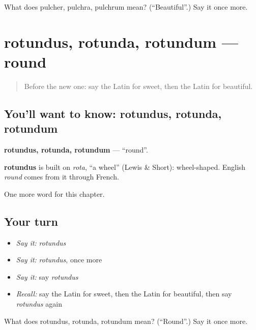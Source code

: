\begin{tcolorbox}[breakable,colback=teal!4,colframe=teal!35!black,title={Before you move on}]
What does pulcher, pulchra, pulchrum mean? (\textquotedblleft{}Beautiful\textquotedblright{}.) Say it once more.
\end{tcolorbox}
\section[rotundus, rotunda, rotundum]{rotundus, rotunda, rotundum — round}

\label{lesson:LA-C96-rotundus}



\begin{quote}
Before the new one: say the Latin for sweet, then the Latin for beautiful.
\end{quote}

\subsection*{You'll want to know: rotundus, rotunda, rotundum}
\textbf{rotundus, rotunda, rotundum} — \textquotedblleft{}round\textquotedblright{}.

\begin{cousinweb}
\textbf{rotundus} is built on \emph{rota}, \textquotedblleft{}a wheel\textquotedblright{} (Lewis \& Short): wheel-shaped. English \emph{round} comes from it through French.
\end{cousinweb}

\begin{grammarlens}[title={What you've built}]
One more word for this chapter.
\end{grammarlens}

\subsection*{Your turn}
\begin{itemize}
\raggedright
  \item \emph{Say it:} \emph{rotundus}
  \item \emph{Say it:} \emph{rotundus}, once more
  \item \emph{Say it:} say \emph{rotundus}
  \item \emph{Recall:} say the Latin for sweet, then the Latin for beautiful, then say \emph{rotundus} again
\end{itemize}

\begin{tcolorbox}[breakable,colback=teal!4,colframe=teal!35!black,title={Before you move on}]
What does rotundus, rotunda, rotundum mean? (\textquotedblleft{}Round\textquotedblright{}.) Say it once more.
\end{tcolorbox}

